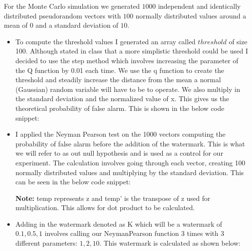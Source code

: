\documentclass[]{assignment}
\begin{document}
For the Monte Carlo simulation we generated $1000$ independent and identically distributed pseudorandom vectors with $100$ normally distributed values around a mean of $0$ and a standard deviation of $10$.
\begin{itemize}

\item To compute the threshold values I generated an array called $threshold$ of size 100. Although stated in class that a more simplistic threshold could be used I decided to use the step method which involves increasing the parameter of the Q function by 0.01 each time. We use the q function to create the threshold and steadily increase the distance from the mean a normal (Gaussian) random variable will have to be to operate. We also multiply in the standard deviation and the normalized value of x. This gives us the theoretical probability of false alarm. This is shown in the below code snippet:

\setlength{\fboxsep}{0pt}%
\setlength{\fboxrule}{1pt}%


\item I applied the Neyman Pearson test on the 1000 vectors computing the probability of false alarm before the addition of the watermark. This is what we will refer to as out null hypothesis and is used as a control for our experiment. The calculation involves going through each vector, creating 100 normally distributed values and multiplying by the standard deviation. This can be seen in the below code snippet:

\setlength{\fboxsep}{0pt}%
\setlength{\fboxrule}{1pt}%

\textbf{Note:} temp represents z and temp’ is the transpose of z used for multiplication. This allows for dot product to be calculated.

\item Adding in the watermark denoted as K which will be a watermark of $0.1, 0.5,1$ involves calling our NeymanPearson function 3 times with 3 different parameters: $1, 2, 10$. This watermark is calculated as shown below:



\end{itemize}
\end{document}

